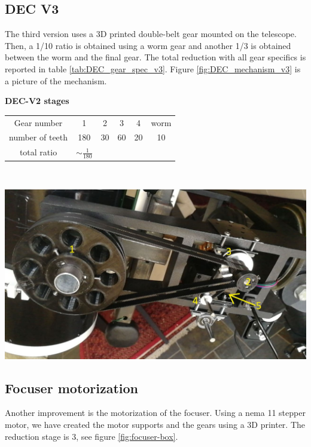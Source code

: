\documentclass{article}
\begin{document}
\begin{multicols}{2}
        \subsection{DEC V3}
        The third version uses a 3D printed double-belt gear mounted on the telescope.
        Then, a 1/10 ratio is obtained using a worm gear and another 1/3 is obtained between the worm and the final gear.
        The total reduction with all gear specifics is reported in table \ref{tab:DEC_gear_spec_v3}.
        Figure \ref{fig:DEC_mechanism_v3} is a picture of the mechanism.

        \begin{minipage}
            {0.5\textwidth}
            \centering
            \textbf{DEC-V2 stages}\\
            \begin{tabular}{cccccc}
                \hline
                Gear number & 1 & 2 & 3 & 4 & worm\\
                number of teeth & 180 & 30 & 60 & 20 & 10\\
                \hline
                total ratio & \(\sim \frac{1}{180}\) &&&
            \end{tabular}
            \label{tab:DEC_gear_spec_v2}
        \end{minipage}
        \\
        \begin{minipage}
            {0.5\textwidth}
            \centering
            \includegraphics[scale=.6]{DEC-v3.jpg}
            \label{fig:DEC_mechanism_v3}
        \end{minipage}

        \subsection{Focuser motorization}
        Another improvement is the motorization of the focuser.
        Using a nema 11 stepper motor, we have created the motor supports and the gears using a 3D printer.
        The reduction stage is 3, see figure \ref{fig:focuser-box}.



\end{multicols}
\end{document}

